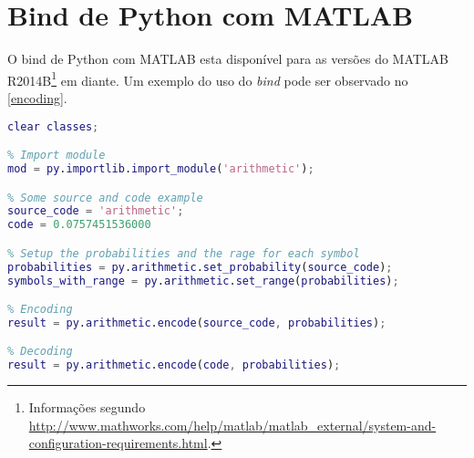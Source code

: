 \label{}


\section*{Bind de Python com MATLAB} %
\label{sec:bind_com_matlab}

O bind de Python com MATLAB esta disponível para as versões do MATLAB R2014B\footnote{Informações segundo \url{http://www.mathworks.com/help/matlab/matlab_external/system-and-configuration-requirements.html}.} em diante. Um exemplo do uso do \textit{bind} pode ser observado no \autoref{encoding}.

\begin{lstlisting}[language=MATLAB,numbers=none,basicstyle=\footnotesize,label=encoding,caption={Chamada de funções python no MATLAB}]
% clear classes, scripts, etc
clear classes;

% Import module
mod = py.importlib.import_module('arithmetic');

% Some source and code example
source_code = 'arithmetic';
code = 0.0757451536000

% Setup the probabilities and the rage for each symbol
probabilities = py.arithmetic.set_probability(source_code);
symbols_with_range = py.arithmetic.set_range(probabilities);

% Encoding
result = py.arithmetic.encode(source_code, probabilities);

% Decoding
result = py.arithmetic.encode(code, probabilities);
\end{lstlisting}

